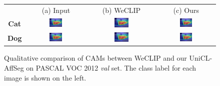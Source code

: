 \begin{figure}[ht]
  \centering
  \setlength{\tabcolsep}{2pt} %
  \renewcommand{\arraystretch}{0.9}

  \begin{tabular}{c c c c} %
    & (a) Input & (b) WeCLIP & (c) Ours \\[1mm]

    \textbf{Cat} &
    \includegraphics[width=0.23\textwidth]{figures/qualitative_analysis/test_cam/2010_005860_6.jpg} &
    \includegraphics[width=0.23\textwidth]{figures/qualitative_analysis/test_cam/2010_005860_6.jpg} &
    \includegraphics[width=0.23\textwidth]{figures/qualitative_analysis/test_cam/2010_005860_6.jpg} \\

    \textbf{Dog} &
    \includegraphics[width=0.23\textwidth]{figures/qualitative_analysis/test_cam/2010_005860_6.jpg} &
    \includegraphics[width=0.23\textwidth]{figures/qualitative_analysis/test_cam/2010_005860_6.jpg} &
    \includegraphics[width=0.23\textwidth]{figures/qualitative_analysis/test_cam/2010_005860_6.jpg} \\
  \end{tabular}

  \caption{Qualitative comparison of CAMs between WeCLIP and our UniCL-AffSeg on PASCAL VOC 2012 \textit{val} set. The class label for each image is shown on the left.}
  \label{fig:qualitative_comparison_cam}
\end{figure}

